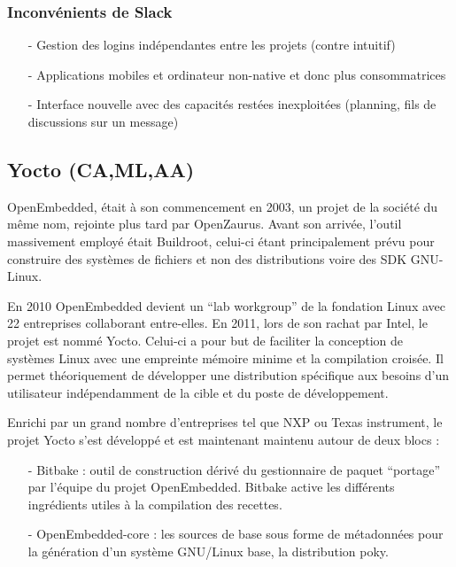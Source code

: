 \subsubsection{Inconvénients de Slack}

\begin{itemize}
    \item[-] Gestion des logins indépendantes entre les projets (contre intuitif)
    \item[-] Applications mobiles et ordinateur non-native et donc plus consommatrices
    \item[-] Interface nouvelle avec des capacités restées inexploitées (planning, fils de discussions
    sur un message)
\end{itemize}

\subsection{Yocto (CA,ML,AA)}

OpenEmbedded, était à son commencement en 2003, un projet de la société du même
nom, rejointe plus tard par OpenZaurus. Avant son arrivée, l'outil massivement employé
était Buildroot, celui-ci étant principalement prévu pour construire des systèmes de fichiers
et non des distributions voire des SDK GNU-Linux. \medskip

En 2010 OpenEmbedded devient un “lab workgroup” de la fondation Linux avec 22
entreprises collaborant entre-elles. En 2011, lors de son rachat par Intel, le projet est
nommé Yocto. Celui-ci a pour but de faciliter la conception de systèmes Linux avec une
empreinte mémoire minime et la compilation croisée. Il permet théoriquement de
développer une distribution spécifique aux besoins d’un utilisateur indépendamment de la
cible et du poste de développement. \medskip

\clearpage

Enrichi par un grand nombre d’entreprises tel que NXP ou Texas instrument, le projet
Yocto s’est développé et est maintenant maintenu autour de deux blocs :

\begin{itemize}
    \item[-] Bitbake : outil de construction dérivé du gestionnaire de paquet “portage” par
    l’équipe du projet OpenEmbedded. Bitbake active les différents ingrédients utiles à
    la compilation des recettes.
    \item[-] OpenEmbedded-core : les sources de base sous forme de métadonnées pour la
    génération d’un système GNU/Linux base, la distribution poky.
\end{itemize}

